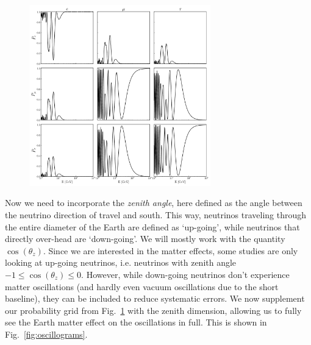 \begin{figure}
    \centering
    \includegraphics[width=0.7\textwidth]{figures/oscillations.pdf}
    \caption{}\label{fig:oscillations}
\end{figure}

Now we need to incorporate the \emph{zenith angle}, here defined as the angle between the neutrino direction of travel and south.
This way, neutrinos traveling through the entire diameter of the Earth are defined as `up-going', while
neutrinos that directly over-head are `down-going'. We will mostly work with the quantity $\cos{(\theta_z)}$.
Since we are interested in the matter effects, some studies are only looking at up-going neutrinos, i.e. neutrinos with
zenith angle $-1 \le \cos{(\theta_z)} \le 0$. However, while down-going neutrinos don't experience matter oscillations (and hardly even vacuum
oscillations due to the short baseline), they can be included to reduce systematic errors.
We now supplement our probability grid from Fig.~\ref{fig:oscillations} with the zenith dimension,
allowing us to fully see the Earth matter effect on the oscillations in full. This is shown in Fig.~\ref{fig:oscillograms}.

